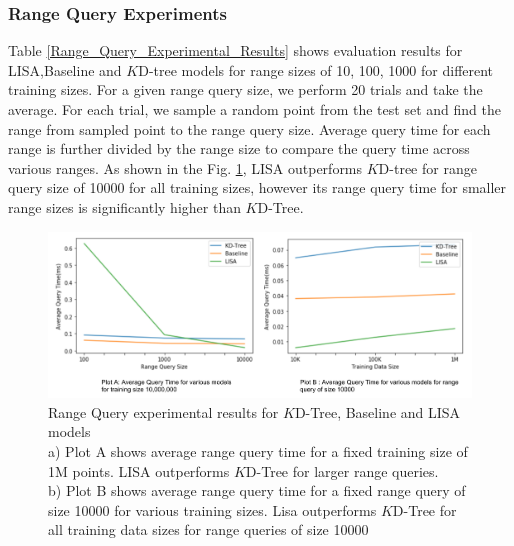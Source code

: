 \subsubsection {Range Query Experiments}
Table \ref{Range_Query_Experimental_Results} shows evaluation results for LISA,Baseline and $K$D-tree models for range sizes of 10, 100, 1000 for different training sizes. For a given range query size, we perform 20 trials and take the average. For each trial, we sample a random point from the test set and find the range from sampled point to the range query size. Average query time for each range is further divided by the range size to compare the query time across various ranges. As shown in the Fig. \ref{fig:Range_Query_Comparision}, LISA outperforms $K$D-tree for range query size of 10000 for all training sizes, however its range query time for smaller range sizes is significantly higher than $K$D-Tree.

\begin{figure}
    \centering
    \includegraphics[width=1.1\textwidth]{graphs/evaluation/RangeQueryPlot.pdf}
    \caption{Range Query experimental results for $K$D-Tree, Baseline and LISA models\\
    a) Plot A shows average range query time for a fixed training size of 1M points. LISA outperforms $K$D-Tree for larger range queries. \\
     b) Plot B shows average range query time for a fixed range query of size 10000 for various training sizes. Lisa outperforms $K$D-Tree for all training data sizes for range queries of size 10000 }
    \label{fig:Range_Query_Comparision}
\end{figure}

